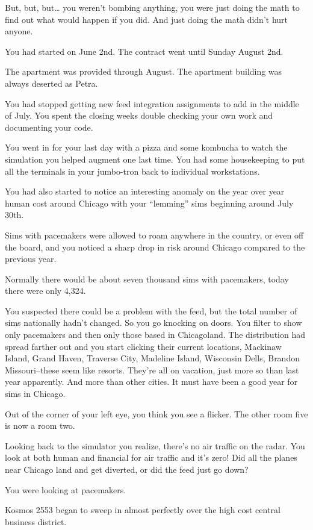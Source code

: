 \documentclass[17pt, twoside, a5paper, openright, extrafontsizes]{memoir}
\begin{document}
But, but, but\ldots{} you weren't bombing anything, you were just doing
the math to find out what would happen if you did. And just doing the
math didn't hurt anyone.

You had started on June 2nd. The contract went until Sunday August 2nd.

The apartment was provided through August. The apartment building was
always deserted as Petra.

You had stopped getting new feed integration assignments to add in the
middle of July. You spent the closing weeks double checking your own
work and documenting your code.

You went in for your last day with a pizza and some kombucha to watch
the simulation you helped augment one last time. You had some
housekeeping to put all the terminals in your jumbo-tron back to
individual workstations.

You had also started to notice an interesting anomaly on the year over
year human cost around Chicago with your ``lemming'' sims beginning
around July 30th.

Sims with pacemakers were allowed to roam anywhere in the country, or
even off the board, and you noticed a sharp drop in risk around Chicago
compared to the previous year.

Normally there would be about seven thousand sims with pacemakers, today
there were only 4,324.

You suspected there could be a problem with the feed, but the total
number of sims nationally hadn't changed. So you go knocking on doors.
You filter to show only pacemakers and then only those based in
Chicagoland. The distribution had spread farther out and you start
clicking their current locations, Mackinaw Island, Grand Haven, Traverse
City, Madeline Island, Wisconsin Dells, Brandon Missouri--these seem
like resorts. They're all on vacation, just more so than last year
apparently. And more than other cities. It must have been a good year
for sims in Chicago.

Out of the corner of your left eye, you think you see a flicker. The
other room five is now a room two.

Looking back to the simulator you realize, there's no air traffic on the
radar. You look at both human and financial for air traffic and it's
zero! Did all the planes near Chicago land and get diverted, or did the
feed just go down?

You were looking at pacemakers.

Kosmos 2553 began to sweep in almost perfectly over the high cost
central business district.
\end{document}
